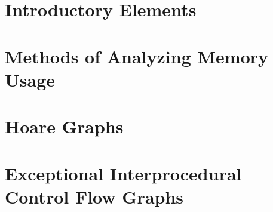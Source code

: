 \documentclass[pageskip]{VTthesis}
\begin{document}
  \frontmatter %
  \maketitle

  \tableofcontents
  \listofalgorithms
  \listoffigures
  \lstlistoflistings
  \listoftables
  \listoftheorems

  \printacronyms[heading=chapter]
  \printunsrtabbreviations[style=altlist] %
  \printunsrtglossary[type=symbols]


  \mainmatter %
  \acresetall %

  \part{Introductory Elements}
  
  

  \part{Methods of Analyzing Memory Usage}\label{memory-usage}
  
  
  

  \part{Hoare Graphs}\label{hg}
  
  
  
  

  \part{Exceptional Interprocedural Control Flow Graphs}\label{eicfg}
  
  
  
\end{document}
